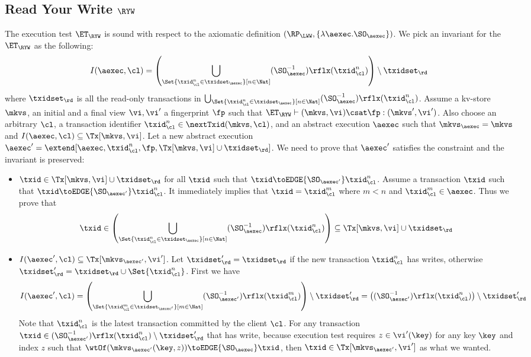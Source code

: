 \subsection{Read Your Write \( \RYW \) }

\label{sec:sound-complete-ryw}

The execution test $\ET_\RYW$ is sound with respect to the axiomatic definition 
$(\RP_{\LWW}, \{\lambda \aexec. \SO_{\aexec} \})$.
We pick an invariant for the \( \ET_\RYW \) as the following:
\[
    I(\aexec, \cl) = \left( \bigcup_{\Set{\txid_{\cl}^{n} \in \txidset_{\aexec} }[ n \in \Nat ]} (\SO_{\aexec}^{-1})\rflx(\txid^n_\cl) \right) \setminus \txidset_\rd
\]
where \( \txidset_\rd \) is all the read-only transactions in \( \bigcup_{\Set{\txid_{\cl}^{n} \in \txidset_{\aexec} }[ n \in \Nat ]} (\SO_{\aexec}^{-1})\rflx(\txid^n_\cl) \).
Assume a kv-store $\mkvs$, an initial and a final view $\vi, \vi'$  a fingerprint $\fp$ 
such that $\ET_{\RYW} \vdash (\mkvs, \vi) \csat \fp: (\mkvs',\vi')$. 
Also choose an arbitrary $\cl$, a transaction identifier $\txid_\cl^n \in \nextTxid(\mkvs, \cl)$, 
and an abstract execution $\aexec$ such that $\mkvs_{\aexec} = \mkvs$ and 
\( I(\aexec, \cl) \subseteq \Tx[\mkvs, \vi] \).
Let a new abstract execution \( \aexec' = \extend[\aexec, \txid_\cl^n, \fp, \Tx[\mkvs, \vi] \cup \txidset_\rd] \).
We need to prove that \( \aexec' \) satisfies the constraint and the invariant is preserved:
\begin{itemize}
    \item \( \txid \in \Tx[\mkvs, \vi] \cup \txidset_\rd  \) for all \( \txid \) such that \( \txid \toEDGE{\SO_{\aexec'}} \txid_\cl^n  \). 
    Assume a transaction \( \txid \) such that \( \txid \toEDGE{\SO_{\aexec'}} \txid_\cl^n \).
It immediately implies that \( \txid = \txid_\cl^m\) where \( m < n \) and \( \txid_\cl^m \in \aexec \).
Thus we prove that 
\[ 
    \txid \in \left( \bigcup_{\Set{\txid_{\cl}^{n} \in \txidset_{\aexec} }[ n \in \Nat]} (\SO_{\aexec}^{-1})\rflx(\txid^n_\cl) \right) \subseteq \Tx[\mkvs,\vi] \cup \txidset_\rd
\]
\item \(I(\aexec',\cl) \subseteq \Tx[\mkvs_{\aexec'}, \vi'] \).
Let \( \txidset'_\rd = \txidset_\rd \) if the new transaction \( \txid_\cl^n\) has writes, otherwise \( \txidset'_\rd = \txidset_\rd \cup \Set{\txid_\cl^n}\).
First we have
\[ I(\aexec', \cl) = \left(\bigcup_{\Set{\txid_{\cl}^{m} \in \txidset_{\aexec'} }[ m \in \Nat ]} (\SO_{\aexec'}^{-1})\rflx(\txid^m_\cl) \right) \setminus \txidset'_{\rd} = \left( (\SO_{\aexec'}^{-1})\rflx(\txid^n_\cl) \right) \setminus \txidset'_\rd 
\]
Note that \( \txid^n_\cl \) is the latest transaction committed by the client \( \cl \).
For any transaction \( \txid \in (\SO_{\aexec'}^{-1})\rflx(\txid^n_\cl) \setminus \txidset'_\rd \) that has write,
because execution test requires \( z \in \vi'(\key) \) for any key \( \key \) and index \( z \) such that \( \wtOf( \mkvs_{\aexec'}(\key, z) ) \toEDGE{\SO_\aexec} \txid \),
then \( \txid \in \Tx[\mkvs_{\aexec'}, \vi'] \) as what we wanted.
\end{itemize}

